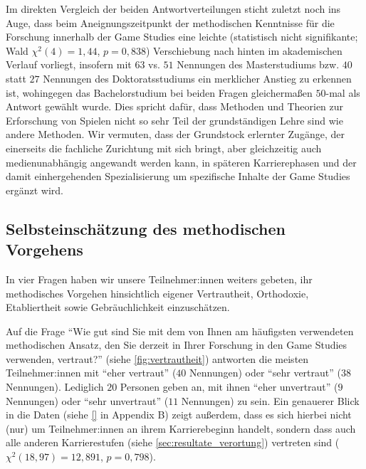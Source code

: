 \documentclass{scrartcl}
\begin{document}
Im direkten Vergleich der beiden Antwortverteilungen sticht zuletzt noch ins Auge, dass beim Aneignungszeitpunkt der methodischen Kenntnisse für die Forschung innerhalb der Game Studies eine leichte (statistisch nicht signifikante; Wald $\chi^{2}(4) = 1,44$, $p = 0,838$) Verschiebung nach hinten im akademischen Verlauf vorliegt, insofern mit $63$ vs. $51$ Nennungen des Masterstudiums bzw. $40$ statt $27$ Nennungen des Doktoratsstudiums ein merklicher Anstieg zu erkennen ist, wohingegen das Bachelorstudium bei beiden Fragen gleichermaßen $50$-mal als Antwort gewählt wurde.
Dies spricht dafür, dass Methoden und Theorien zur Erforschung von Spielen nicht so sehr Teil der grundständigen Lehre sind wie andere Methoden.
Wir vermuten, dass der Grundstock erlernter Zugänge, der einerseits die fachliche Zurichtung mit sich bringt, aber gleichzeitig auch medienunabhängig angewandt werden kann, in späteren Karrierephasen und der damit einhergehenden Spezialisierung um spezifische Inhalte der Game Studies ergänzt wird.


\subsection{Selbsteinschätzung des methodischen Vorgehens}\label{sec:resultate_selbsteinschätzung}
In vier Fragen haben wir unsere Teilnehmer:innen weiters gebeten, ihr methodisches Vorgehen hinsichtlich eigener Vertrautheit, Orthodoxie, Etabliertheit sowie Gebräuchlichkeit einzuschätzen.

Auf die Frage \enquote{Wie gut sind Sie mit dem von Ihnen am häufigsten verwendeten methodischen Ansatz, den Sie derzeit in Ihrer Forschung in den Game Studies verwenden, vertraut?} (siehe \autoref{fig:vertrautheit}) antworten die meisten Teilnehmer:innen mit \enquote{eher vertraut} ($40$ Nennungen) oder \enquote{sehr vertraut} ($38$ Nennungen).
Lediglich $20$ Personen geben an, mit ihnen \enquote{eher unvertraut} ($9$ Nennungen) oder \enquote{sehr unvertraut} ($11$ Nennungen) zu sein.
Ein genauerer Blick in die Daten (siehe \autoref{} in Appendix B) zeigt außerdem, dass es sich hierbei nicht (nur) um Teilnehmer:innen an ihrem Karrierebeginn handelt, sondern dass auch alle anderen Karrierestufen (siehe \autoref{sec:resultate_verortung}) vertreten sind ($\chi^{2}(18, 97) = 12,891$, $p = 0,798$).
\end{document}

